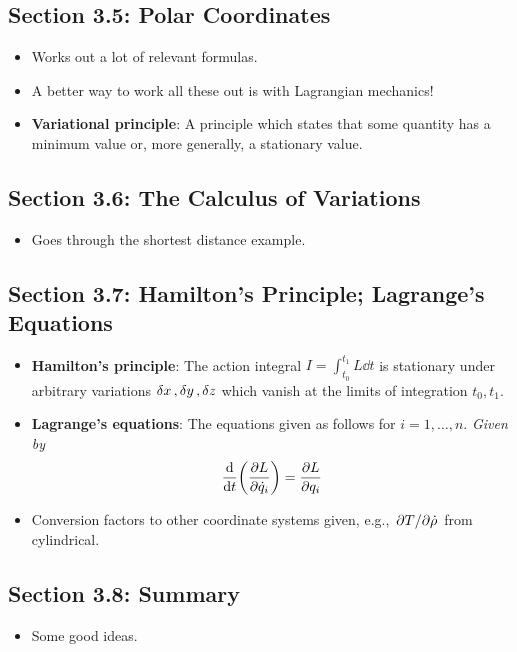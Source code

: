 \documentclass[../notes.tex]{subfiles}
\begin{document}
\subsection*{Section 3.5: Polar Coordinates}
\begin{itemize}
    \item Works out a lot of relevant formulas.
    \item A better way to work all these out is with Lagrangian mechanics!
    \item \textbf{Variational principle}: A principle which states that some quantity has a minimum value or, more generally, a stationary value.
\end{itemize}


\subsection*{Section 3.6: The Calculus of Variations}
\begin{itemize}
    \item Goes through the shortest distance example.
\end{itemize}


\subsection*{Section 3.7: Hamilton's Principle; Lagrange's Equations}
\begin{itemize}
    \item \textbf{Hamilton's principle}: The action integral $I=\int_{t_0}^{t_1}L\dd{t}$ is stationary under arbitrary variations $\var{x},\var{y},\var{z}$ which vanish at the limits of integration $t_0,t_1$.
    \item \textbf{Lagrange's equations}: The equations given as follows for $i=1,\dots,n$. \emph{Given by}
    \begin{equation*}
        \dv{t}(\pdv{L}{\dot{q}_i}) = \pdv{L}{q_i}
    \end{equation*}
    \item Conversion factors to other coordinate systems given, e.g., $\pdv*{T}{\dot{\rho}}$ from cylindrical.
\end{itemize}


\subsection*{Section 3.8: Summary}
\begin{itemize}
    \item Some good ideas.
\end{itemize}
\end{document}
